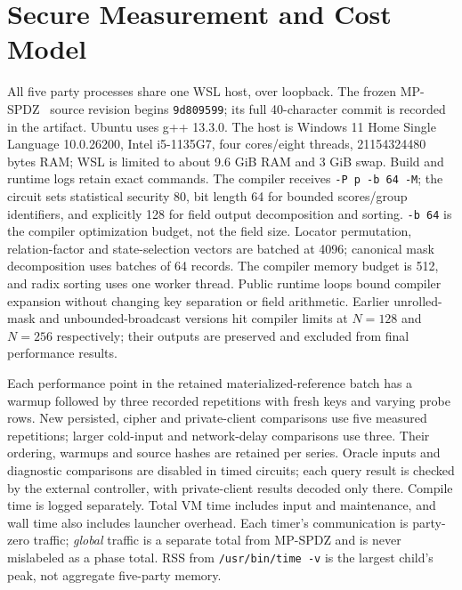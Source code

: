 \documentclass[journal,onecolumn]{IEEEtran}
\begin{document}
\section{Secure Measurement and Cost Model}\label{suppsec:supplement:7}
All five party processes share one WSL host, over loopback. The frozen MP-SPDZ~\cite{keller2020mpspdz} source revision begins \texttt{9d809599}; its full 40-character commit is recorded in the artifact. Ubuntu uses g++ 13.3.0. The host is Windows 11 Home Single Language 10.0.26200, Intel i5-1135G7, four cores/eight threads, 21154324480 bytes RAM; WSL is limited to about 9.6 GiB RAM and 3 GiB swap. Build and runtime logs retain exact commands. The compiler receives \texttt{-P p -b 64 -M}; the circuit sets statistical security 80, bit length 64 for bounded scores/group identifiers, and explicitly 128 for field output decomposition and sorting. \texttt{-b 64} is the compiler optimization budget, not the field size. Locator permutation, relation-factor and state-selection vectors are batched at 4096; canonical mask decomposition uses batches of 64 records. The compiler memory budget is 512, and radix sorting uses one worker thread. Public runtime loops bound compiler expansion without changing key separation or field arithmetic. Earlier unrolled-mask and unbounded-broadcast versions hit compiler limits at $N=128$ and $N=256$ respectively; their outputs are preserved and excluded from final performance results.

Each performance point in the retained materialized-reference batch has a warmup followed by three recorded repetitions with fresh keys and varying probe rows. New persisted, cipher and private-client comparisons use five measured repetitions; larger cold-input and network-delay comparisons use three. Their ordering, warmups and source hashes are retained per series. Oracle inputs and diagnostic comparisons are disabled in timed circuits; each query result is checked by the external controller, with private-client results decoded only there. Compile time is logged separately. Total VM time includes input and maintenance, and wall time also includes launcher overhead. Each timer's communication is party-zero traffic; \emph{global} traffic is a separate total from MP-SPDZ and is never mislabeled as a phase total. RSS from \texttt{/usr/bin/time -v} is the largest child's peak, not aggregate five-party memory.
\end{document}
